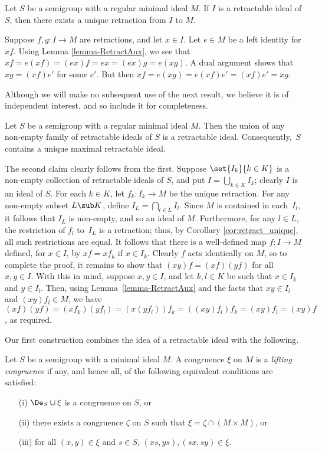 \begin{cor}\label{cor:retract_unique}
Let $S$ be a semigroup with a regular minimal ideal $M$.  If $I$ is a retractable ideal of $S$, then there exists a unique retraction from $I$ to $M$.
\end{cor}

\pf
Suppose $f,g:I\to M$ are retractions, and let $x\in I$.  Let $e\in M$ be a
left identity for $xf$.  Using Lemma \ref{lemma-RetractAux}, we see that
$xf = e (xf) = (ex)f = ex = (ex)g = e (xg)$.  A dual argument shows that
$xg=(xf) e'$ for some $e'$.  But then $xf = e (xg) = e (xf)  e' = (xf)e'=xg$.
\epf

Although we will make no subsequent use of the next result, we believe it is of independent interest, and so include it for completeness.


\begin{prop}
Let $S$ be a semigroup with a regular minimal ideal $M$.  Then the union of any non-empty family of retractable ideals of $S$ is a retractable ideal.  Consequently,~$S$ contains a unique maximal retractable ideal.
\end{prop}

\pf The second claim clearly follows from the first.  Suppose $\set{I_k}{k\in K}$ is a non-empty collection of retractable ideals of $S$, and put $I=\bigcup_{k\in K}I_k$; clearly $I$ is an ideal of $S$.  For each $k\in K$, let $f_k:I_k\to M$ be the unique retraction.  For any non-empty subset $L\sub K$, define $I_L=\bigcap_{l\in L}I_l$.  Since $M$ is contained in each~$I_l$, it follows that $I_L$ is non-empty, and so an ideal of $M$.  Furthermore, for any $l\in L$, the restriction of $f_l$ to~$I_L$ is a retraction; thus, by Corollary \ref{cor:retract_unique}, all such restrictions are equal.  It follows that there is a well-defined map $f:I\to M$ defined, for $x\in I$, by $xf=xf_k$ if $x\in I_k$.  Clearly $f$ acts identically on $M$, so to complete the proof, it remains to show that $(xy)f=(xf)(yf)$ for all $x,y\in I$.  With this in mind, suppose $x,y\in I$, and let $k,l\in K$ be such that $x\in I_k$ and $y\in I_l$.  Then, using Lemma~\ref{lemma-RetractAux} and the facts that $xy\in I_l$ and $(xy)f_l\in M$, we have $(xf)(yf) = (xf_k)(yf_l) = (x(yf_l))f_k = ((xy)f_l)f_k = (xy)f_l = (xy)f$, as required.
\epf

Our first construction combines the idea of a retractable ideal with the following.

\newpage

\begin{defn}\label{defn:lift}
Let $S$ be a semigroup with a minimal ideal $M$.  A congruence $\xi$ on $M$ is a \emph{lifting congruence} if any, and hence all, of the following equivalent conditions are satisfied:
\begin{itemize}
\item[(i)] $\De_S\cup\xi$ is a congruence on $S$, or
\item[(ii)] there exists a congruence $\zeta$ on $S$ such that $\xi=\zeta\cap(M\times M)$, or
\item[(iii)] for all $(x,y)\in\xi$ and $s\in S$, $(xs,ys),(sx,sy)\in\xi$.
\end{itemize}
\end{defn}

